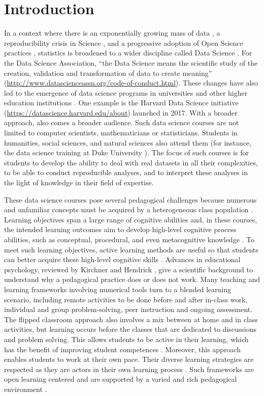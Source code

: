 \documentclass{aims}
\theoremstyle{definition}
\begin{document}
\hypertarget{introduction}{%
\section{Introduction}\label{introduction}}

In a context where there is an exponentially growing mass of data
\cite{Marx2013}, a reproducibility crisis in Science \cite{Baker2016},
and a progressive adoption of Open Science practices \cite{Banks2019},
statistics is broadened to a wider discipline called Data Science
\cite{Cleveland2001}. For the Data Science Association, ``the Data
Science means the scientific study of the creation, validation and
transformation of data to create meaning''
(\url{http://www.datascienceassn.org/code-of-conduct.html}). These
changes have also led to the emergence of data science programs in
universities and other higher education institutions
\cite{Donoho2017, Cetinkaya-Rundel2021}. One example is the Harvard Data
Science initiative (\url{https://datascience.harvard.edu/about})
launched in 2017. With a broader approach, also comes a broader
audience. Such data science courses are not limited to computer
scientists, mathematicians or statisticians. Students in humanities,
social sciences, and natural sciences also attend them (for instance,
the data science training at Duke University
\cite{Cetinkaya-Rundel2021}). The focus of such courses is for students
to develop the ability to deal with real datasets in all their
complexities, to be able to conduct reproducible analyses, and to
interpret these analyses in the light of knowledge in their field of
expertise.

These data science courses pose several pedagogical challenges because
numerous and unfamiliar concepts must be acquired by a heterogeneous
class population \cite{Guzman2019}. Learning objectives span a large
range of cognitive abilities and, in these courses, the intended
learning outcomes aim to develop high-level cognitive process abilities,
such as conceptual, procedural, and even metacognitive knowledge
\cite{Krathwohl2002}. To meet such learning objectives, active learning
methods are useful so that students can better acquire these high-level
cognitive skills \cite{Freeman2014}. Advances in educational psychology,
reviewed by Kirchner and Hendrick \cite{Kirschner2020}, give a
scientific background to understand why a pedagogical practice does or
does not work. Many teaching and learning frameworks involving numerical
tools turn to a blended learning scenario, including remote activities
to be done before and after in-class work, individual and group
problem-solving, peer instruction and ongoing assessment. The flipped
classroom approach also involves a mix between at home and in class
activities, but learning occurs before the classes that are dedicated to
discussions and problem solving. This allows students to be active in
their learning, which has the benefit of improving student competences
\cite{Freeman2014}. Moreover, this approach enables students to work at
their own pace. Their diverse learning strategies are respected as they
are actors in their own learning process \cite{Spadafora2018}. Such
frameworks are open learning centered and are supported by a varied and
rich pedagogical environment \cite{Burton2011}.
\end{document}
